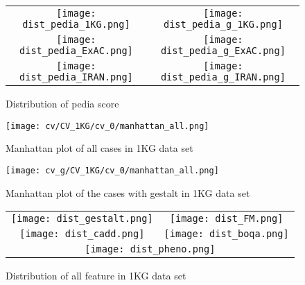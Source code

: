 \documentclass[12pt,cspaper]{paper}
\begin{document}
\begin{figure}[ht]
  \begin{center}
    \graphicspath{{./table/}}
    \begin{tabular}{cc}
      \texttt{[image: dist\_pedia\_1KG.png]}&
      \texttt{[image: dist\_pedia\_g\_1KG.png]}\\
      \texttt{[image: dist\_pedia\_ExAC.png]}&
      \texttt{[image: dist\_pedia\_g\_ExAC.png]}\\
      \texttt{[image: dist\_pedia\_IRAN.png]}&
      \texttt{[image: dist\_pedia\_g\_IRAN.png]}\\
    \end{tabular}
  \caption{Distribution of pedia score}
  \end{center}
\end{figure}
\begin{figure}[ht]
  \begin{center}
    \graphicspath{{../output/}}
      \texttt{[image: cv/CV\_1KG/cv\_0/manhattan\_all.png]}
  \caption{Manhattan plot of all cases in 1KG data set}
  \end{center}
\end{figure}
\begin{figure}[ht]
  \begin{center}
    \graphicspath{{../output/}}
      \texttt{[image: cv\_g/CV\_1KG/cv\_0/manhattan\_all.png]}
  \caption{Manhattan plot of the cases with gestalt in 1KG data set}
  \end{center}
\end{figure}
\begin{figure}[ht]
  \begin{center}
    \graphicspath{{../output/distribution/CV_1KG/}}
    \begin{tabular}{cc}
      \texttt{[image: dist\_gestalt.png]}&
      \texttt{[image: dist\_FM.png]}\\
      \texttt{[image: dist\_cadd.png]}&
      \texttt{[image: dist\_boqa.png]}\\
      \multicolumn{2}{c}{\texttt{[image: dist\_pheno.png]}}\\
    \end{tabular}
  \caption{Distribution of all feature in 1KG data set}
  \end{center}
\end{figure}
\end{document}
